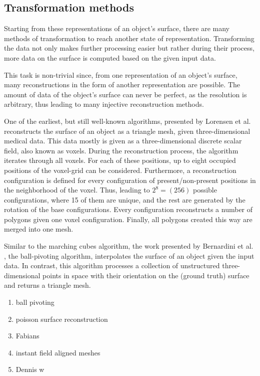 \subsection{Transformation methods}
Starting from these representations of an object's surface, there are many methods 
of transformation to reach another state of representation. 
Transforming the data not only makes further processing easier
 but rather during their process, more data on the surface is 
 computed based on the given input data.

 This task is non-trivial since, from one representation of an object's surface, many reconstructions in the form of another representation are possible. The amount of data of the object's surface can never be perfect, as the resolution is arbitrary, thus leading to many injective reconstruction methods.

One of the earliest, but still well-known algorithms, presented by
 Lorensen et al. \cite{Lorensen:1987:MCH:37402.37422} reconstructs the surface of an object as a
  triangle mesh, given three-dimensional medical data. This data mostly is given as
   a three-dimensional discrete scalar field, also known as voxels. 
During the reconstruction process, the algorithm iterates through all voxels. For each of these positions, up to eight occupied positions of the voxel-grid can be considered. Furthermore, a reconstruction configuration is defined for every configuration of present/non-present positions in the neighborhood of the voxel. Thus, leading to $2^8 = (256)$ possible configurations, where 15 of them are unique, and the rest are generated by the rotation of the base configurations.  Every configuration reconstructs a number of polygons given one voxel configuration. Finally, all polygons created this way are merged into one mesh.

Similar to the marching cubes algorithm, the work presented by 
Bernardini et al. \cite{817351}, the ball-pivoting algorithm, interpolates
 the surface of an object given the input data. In contrast, this 
 algorithm processes a collection of unstructured three-dimensional
  points in space with their orientation on the (ground truth) surface and returns 
  a triangle mesh.
\begin{enumerate}
  \item ball pivoting
  \item poisson surface reconstruction
  \item Fabians \cite{Groh2017}
  \item instant field aligned meshes
  \item Dennis w\cite{bukenberger2018hierarchical}
\end{enumerate}


